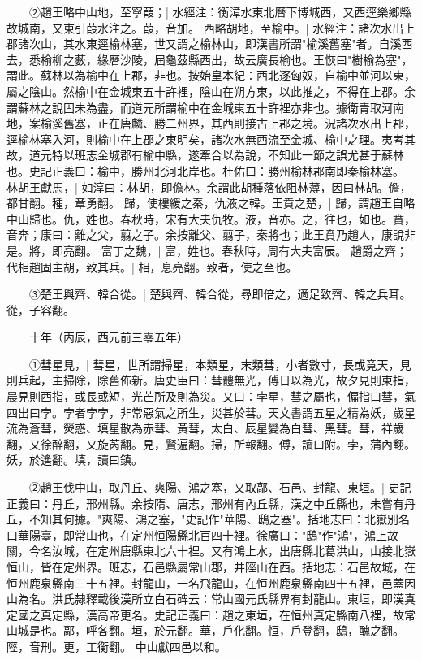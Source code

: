 　　②趙王略中山地，至寧葭；|{
	水經注：衡漳水東北曆下博城西，又西逕樂鄉縣故城南，又東引葭水注之。葭，音加。
	}
西略胡地，至榆中。|{
	水經注：諸次水出上郡諸次山，其水東逕榆林塞，世又謂之榆林山，即漢書所謂"榆溪舊塞"者。自溪西去，悉榆柳之藪，緣曆沙陵，屆龜茲縣西出，故云廣長榆也。王恢曰"樹榆為塞"，謂此。蘇林以為榆中在上郡，非也。按始皇本紀：西北逐匈奴，自榆中並河以東，屬之陰山。然榆中在金城東五十許裡，陰山在朔方東，以此推之，不得在上郡。余謂蘇林之說固未為盡，而道元所謂榆中在金城東五十許裡亦非也。據衛青取河南地，案榆溪舊塞，正在唐麟、勝二州界，其西則接古上郡之境。況諸次水出上郡，逕榆林塞入河，則榆中在上郡之東明矣，諸次水無西流至金城、榆中之理。夷考其故，道元特以班志金城郡有榆中縣，遂牽合以為說，不知此一節之誤尤甚于蘇林也。史記正義曰：榆中，勝州北河北岸也。杜佑曰：勝州榆林郡南即秦榆林塞。
	}
林胡王獻馬，|{
	如淳曰：林胡，即儋林。余謂此胡種落依阻林薄，因曰林胡。儋，都甘翻。種，章勇翻。
	}
歸，使樓緩之秦，仇液之韓。王賁之楚，|{
	歸，謂趙王自略中山歸也。仇，姓也。春秋時，宋有大夫仇牧。液，音亦。之，往也，如也。賁，音奔；康曰：離之父，翦之子。余按離父、翦子，秦將也；此王賁乃趙人，康說非是。將，即亮翻。
	}
富丁之魏，|{
	富，姓也。春秋時，周有大夫富辰。
	}
趙爵之齊；代相趙固主胡，致其兵。|{
	相，息亮翻。致者，使之至也。
	}

　　③楚王與齊、韓合從。|{
	楚與齊、韓合從，尋即倍之，適足致齊、韓之兵耳。從，子容翻。
	}

　　十年（丙辰，西元前三零五年）

　　①彗星見，|{
	彗星，世所謂掃星，本類星，末類彗，小者數寸，長或竟天，見則兵起，主掃除，除舊佈新。唐史臣曰：彗體無光，傅日以為光，故夕見則東指，晨見則西指，或長或短，光芒所及則為災。又曰：孛星，彗之屬也，偏指曰彗，氣四出曰孛。孛者孛孛，非常惡氣之所生，災甚於彗。天文書謂五星之精為妖，歲星流為蒼彗，熒惑、填星散為赤彗、黃彗，太白、辰星變為白彗、黑彗。彗，祥歲翻，又徐醉翻，又旋芮翻。見，賢遍翻。掃，所報翻。傅，讀曰附。孛，蒲內翻。妖，於遙翻。填，讀曰鎮。
	}

　　②趙王伐中山，取丹丘、爽陽、鴻之塞，又取鄗、石邑、封龍、東垣。|{
	史記正義曰：丹丘，邢州縣。余按隋、唐志，邢州有內丘縣，漢之中丘縣也，未嘗有丹丘，不知其何據。"爽陽、鴻之塞，"史記作"華陽、鴟之塞"。括地志曰：北嶽別名曰華陽臺，即常山也，在定州恒陽縣北百四十裡。徐廣曰："鴟"作"鴻"，鴻上故關，今名汝城，在定州唐縣東北六十裡。又有鴻上水，出唐縣北葛洪山，山接北嶽恒山，皆在定州界。班志，石邑縣屬常山郡，井陘山在西。括地志：石邑故城，在恒州鹿泉縣南三十五裡。封龍山，一名飛龍山，在恒州鹿泉縣南四十五裡，邑蓋因山為名。洪氏隸釋載後漢所立白石碑云：常山國元氏縣界有封龍山。東垣，即漢真定國之真定縣，漢高帝更名。史記正義曰：趙之東垣，在恒州真定縣南八裡，故常山城是也。鄗，呼各翻。垣，於元翻。華，戶化翻。恒，戶登翻，鴟，醜之翻。陘，音刑。更，工衡翻。
	}
中山獻四邑以和。

